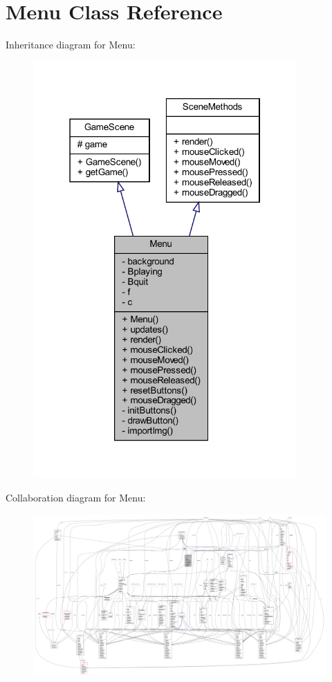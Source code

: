 \hypertarget{classscenes_1_1_menu}{}\section{Menu Class Reference}
\label{classscenes_1_1_menu}


Inheritance diagram for Menu\+:\nopagebreak
\begin{figure}[H]
\begin{center}
\leavevmode
\includegraphics[width=286pt]{classscenes_1_1_menu__inherit__graph}
\end{center}
\end{figure}


Collaboration diagram for Menu\+:
\nopagebreak
\begin{figure}[H]
\begin{center}
\leavevmode
\includegraphics[width=350pt]{classscenes_1_1_menu__coll__graph}
\end{center}
\end{figure}
